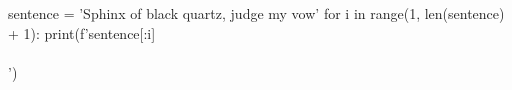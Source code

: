 sentence = 'Sphinx of black quartz, judge my vow'
for i in range(1, len(sentence) + 1):
    print(f'{sentence[:i]}\\\\')

